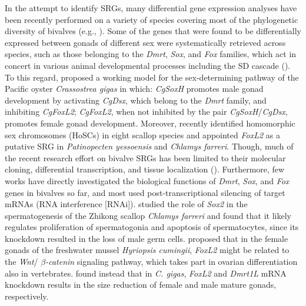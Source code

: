 \documentclass[../main.tex]{subfiles}
\begin{document}
In the attempt to identify SRGs, many differential gene expression analyses have been recently performed on a variety of species covering most of the phylogenetic diversity of bivalves (e.g., \textbf{\cite{milani2013nuclear,zhang2014genomic,chen2017transcriptome,capt2018deciphering,ghiselli2018comparative,shi2018proteome}}). Some of the genes that were found to be differentially expressed between gonads of different sex were systematically retrieved across species, such as those belonging to the \textit{Dmrt}, \textit{Sox}, and \textit{Fox} families, which act in concert in various animal developmental processes including the SD cascade (\textbf{\cite{marshall2010homologies,beukeboom2014evolution}}). To this regard, \textbf{\cite{zhang2014genomic}} proposed a working model for the sex-determining pathway of the Pacific oyster \textit{Crassostrea gigas} in which: \textit{CgSoxH} promotes male gonad development by activating \textit{CgDsx}, which belong to the \textit{Dmrt} family, and inhibiting \textit{CgFoxL2}; \textit{CgFoxL2}, when not inhibited by the pair \textit{CgSoxH}/\textit{CgDsx}, promotes female gonad development. Moreover, \textbf{\cite{han2022ancient}} recently identified homomorphic sex chromosomes (HoSCs) in eight scallop species and appointed \textit{FoxL2} as a putative SRG in \textit{Patinopecten yessoensis} and \textit{Chlamys farreri}. Though, much of the recent research effort on bivalve SRGs has been limited to their molecular cloning, differential transcription, and tissue localization (\textbf{\cite{liang2019sox2,sun2022examination}}). Furthermore, few works have directly investigated the biological functions of \textit{Dmrt}, \textit{Sox}, and \textit{Fox} genes in bivalves so far, and most used post-transcriptional silencing of target mRNAs (RNA interference [RNAi]). \textbf{\cite{liang2019sox2}} studied the role of \textit{Sox2} in the spermatogenesis of the Zhikong scallop \textit{Chlamys farreri} and found that it likely regulates proliferation of spermatogonia and apoptosis of spermatocytes, since its knockdown resulted in the loss of male germ cells. \textbf{\cite{wang2020identification}} proposed that in the female gonads of the freshwater mussel \textit{Hyriopsis cumingii}, \textit{FoxL2} might be related to the \textit{Wnt}/\textit{ $\beta$-catenin} signaling pathway, which takes part in ovarian differentiation also in vertebrates. \textbf{\cite{sun2022examination}} found instead that in \textit{C. gigas}, \textit{FoxL2} and \textit{Dmrt1L} mRNA knockdown results  in the size reduction of female and male mature gonads, respectively.
\end{document}
